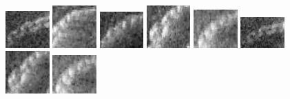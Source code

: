 \begin{figure}
    \includegraphics[width=0.15\textwidth]{chapters/images/dataset/all-class-images/chain/chain-220.jpg}    
    \includegraphics[width=0.15\textwidth]{chapters/images/dataset/all-class-images/chain/chain-141.jpg}
    \includegraphics[width=0.15\textwidth]{chapters/images/dataset/all-class-images/chain/chain-110.jpg}
    \includegraphics[width=0.15\textwidth]{chapters/images/dataset/all-class-images/chain/chain-129.jpg}
    \includegraphics[width=0.15\textwidth]{chapters/images/dataset/all-class-images/chain/chain-211.jpg}
    \includegraphics[width=0.15\textwidth]{chapters/images/dataset/all-class-images/chain/chain-187.jpg}
    \includegraphics[width=0.15\textwidth]{chapters/images/dataset/all-class-images/chain/chain-131.jpg}        
    \includegraphics[width=0.15\textwidth]{chapters/images/dataset/all-class-images/chain/chain-212.jpg}

\end{figure}
